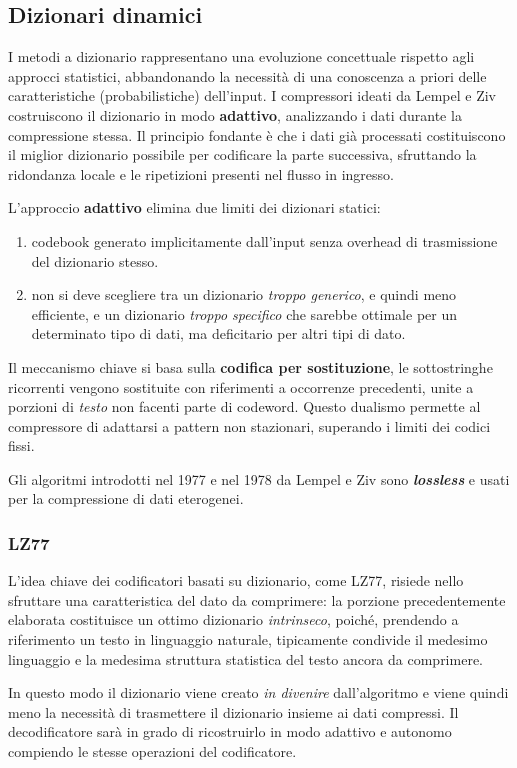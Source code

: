 \subsection{Dizionari dinamici}
I metodi a dizionario rappresentano una evoluzione concettuale rispetto agli approcci statistici, abbandonando la necessità di una conoscenza a priori delle caratteristiche (probabilistiche) dell'input. I compressori ideati da Lempel e Ziv costruiscono il dizionario in modo \textbf{adattivo}, analizzando i dati durante la compressione stessa. Il principio fondante è che i dati già processati costituiscono il miglior dizionario possibile per codificare la parte successiva, sfruttando la ridondanza locale e le ripetizioni presenti nel flusso in ingresso.

L'approccio \textbf{adattivo} elimina due limiti dei dizionari statici:
\begin{enumerate}
    \item codebook generato implicitamente dall'input senza overhead di trasmissione del dizionario stesso.
    \item non si deve scegliere tra un dizionario \textit{troppo generico}, e quindi meno efficiente, e un dizionario \textit{troppo specifico} che sarebbe ottimale per un determinato tipo di dati, ma deficitario per altri tipi di dato.    
\end{enumerate}
Il meccanismo chiave si basa sulla \textbf{codifica per sostituzione}, le sottostringhe ricorrenti vengono sostituite con riferimenti a occorrenze precedenti, unite a porzioni di \textit{testo} non facenti parte di codeword. Questo dualismo permette al compressore di adattarsi a pattern non stazionari, superando i limiti dei codici fissi.

Gli algoritmi introdotti nel 1977 e nel 1978 da Lempel e Ziv sono \textbf{\textit{lossless}} e usati per la compressione di dati eterogenei. 

\subsubsection{LZ77}
L'idea chiave dei codificatori basati su dizionario, come LZ77, risiede nello sfruttare una caratteristica del dato da comprimere: la porzione precedentemente elaborata costituisce un ottimo dizionario \textit{intrinseco}, poiché, prendendo a riferimento un testo in linguaggio naturale, tipicamente condivide il medesimo linguaggio e la medesima struttura statistica del testo ancora da comprimere.

In questo modo il dizionario viene creato \textit{in divenire} dall'algoritmo e viene quindi meno la necessità di trasmettere il dizionario insieme ai dati compressi. Il decodificatore sarà in grado di ricostruirlo in modo adattivo e autonomo compiendo le stesse operazioni del codificatore.

